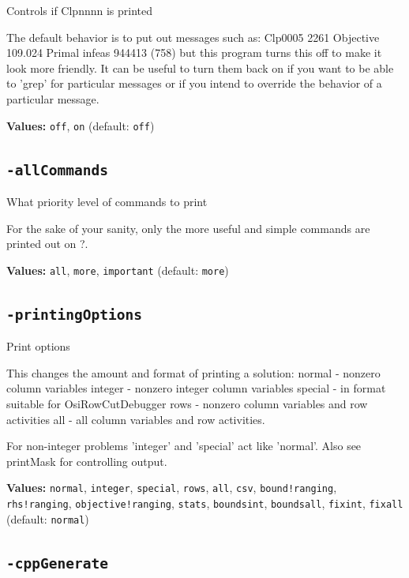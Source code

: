 \documentclass[11pt,a4paper]{article}
\begin{document}
Controls if Clpnnnn is printed

The default behavior is to put out messages such as:
 Clp0005 2261  Objective 109.024 Primal infeas 944413 (758)
 but this program turns this off to make it look more friendly.  It can be useful to turn them back on if you want to be able to 'grep' for particular messages or if you intend to override the behavior of a particular message.

\textbf{Values:} \texttt{off}, \texttt{on} (default: \texttt{off})

\subsection*{\texttt{-allCommands}}

What priority level of commands to print

For the sake of your sanity, only the more useful and simple commands are printed out on ?.

\textbf{Values:} \texttt{all}, \texttt{more}, \texttt{important} (default: \texttt{more})

\subsection*{\texttt{-printingOptions}}

Print options

This changes the amount and format of printing a solution:
normal - nonzero column variables 
 integer - nonzero integer column variables
 special - in format suitable for OsiRowCutDebugger
 rows - nonzero column variables and row activities
 all - all column variables and row activities.

 For non-integer problems 'integer' and 'special' act like 'normal'. Also see printMask for controlling output.

\textbf{Values:} \texttt{normal}, \texttt{integer}, \texttt{special}, \texttt{rows}, \texttt{all}, \texttt{csv}, \texttt{bound!ranging}, \texttt{rhs!ranging}, \texttt{objective!ranging}, \texttt{stats}, \texttt{boundsint}, \texttt{boundsall}, \texttt{fixint}, \texttt{fixall} (default: \texttt{normal})

\subsection*{\texttt{-cppGenerate}}
\end{document}
